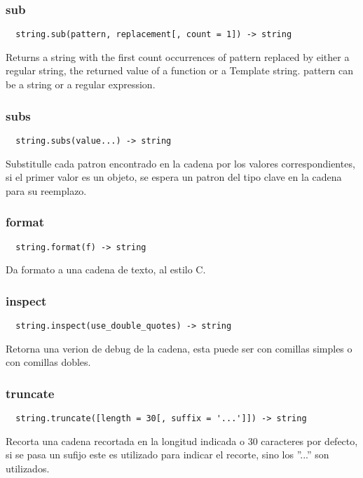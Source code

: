 \subsubsection*{sub}
\begin{verbatim}
  string.sub(pattern, replacement[, count = 1]) -> string
\end{verbatim}
Returns a string with the first count occurrences of pattern replaced by either
a regular string, the returned value of a function or a Template string. pattern
can be a string or a regular expression.

\subsubsection*{subs}
\begin{verbatim}
  string.subs(value...) -> string
\end{verbatim}
Substitulle cada patron encontrado en la cadena por los valores
correspondientes, si el primer valor es un objeto, se espera un patron del tipo
clave en la cadena para su reemplazo.

\subsubsection*{format}
\begin{verbatim}
  string.format(f) -> string
\end{verbatim}
Da formato a una cadena de texto, al estilo C.

\subsubsection*{inspect} 
\begin{verbatim}
  string.inspect(use_double_quotes) -> string
\end{verbatim}
Retorna una verion de debug de la cadena, esta puede ser con comillas simples o
con comillas dobles.

\subsubsection*{truncate}
\begin{verbatim}
  string.truncate([length = 30[, suffix = '...']]) -> string
\end{verbatim}
Recorta una cadena recortada en la longitud indicada o 30 caracteres por
defecto, si se pasa un sufijo este es utilizado para indicar el recorte, sino
los ''...'' son utilizados.

